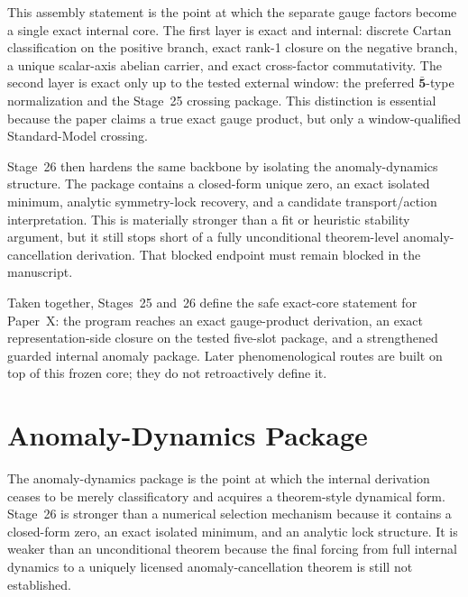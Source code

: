 \documentclass[11pt]{article}
\begin{document}
This assembly statement is the point at which the separate gauge factors become a single exact internal core. The first layer is exact and internal: discrete Cartan classification on the positive branch, exact rank-1 closure on the negative branch, a unique scalar-axis abelian carrier, and exact cross-factor commutativity. The second layer is exact only up to the tested external window: the preferred \texorpdfstring{$\bar{\mathbf 5}$}{5bar}-type normalization and the Stage~25 crossing package. This distinction is essential because the paper claims a true exact gauge product, but only a window-qualified Standard-Model crossing.

Stage~26 then hardens the same backbone by isolating the anomaly-dynamics structure. The package contains a closed-form unique zero, an exact isolated minimum, analytic symmetry-lock recovery, and a candidate transport/action interpretation. This is materially stronger than a fit or heuristic stability argument, but it still stops short of a fully unconditional theorem-level anomaly-cancellation derivation. That blocked endpoint must remain blocked in the manuscript.

Taken together, Stages~25 and~26 define the safe exact-core statement for Paper~X: the program reaches an exact gauge-product derivation, an exact representation-side closure on the tested five-slot package, and a strengthened guarded internal anomaly package. Later phenomenological routes are built on top of this frozen core; they do not retroactively define it.

\section{Anomaly-Dynamics Package}
The anomaly-dynamics package is the point at which the internal derivation ceases to be merely classificatory and acquires a theorem-style dynamical form. Stage~26 is stronger than a numerical selection mechanism because it contains a closed-form zero, an exact isolated minimum, and an analytic lock structure. It is weaker than an unconditional theorem because the final forcing from full internal dynamics to a uniquely licensed anomaly-cancellation theorem is still not established.
\end{document}
